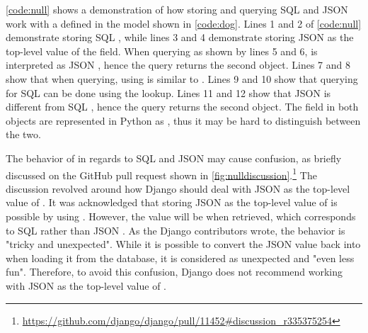 \noindent
\begin{minipage}{\linewidth}

\end{minipage}

\autoref{code:null} shows a demonstration of how storing and querying SQL
 and JSON  work with a  defined in the
 model shown in \autoref{code:dog}. Lines 1 and 2 of
\autoref{code:null} demonstrate storing SQL , while lines 3 and 4
demonstrate storing JSON  as the top-level value of the field. When
querying as shown by lines 5 and 6,  is interpreted as JSON
, hence the query returns the second object. Lines 7 and 8 show that
when querying, using  is similar to . Lines
9 and 10 show that querying for SQL  can be done using the
 lookup. Lines 11 and 12 show that JSON  is different
from SQL , hence the query returns the second object. The
 field in both objects are represented in Python as ,
thus it may be hard to distinguish between the two.

The behavior of  in regards to SQL  and JSON
 may cause confusion, as briefly discussed on the GitHub pull
request shown in
\autoref{fig:nulldiscussion}.\footnote{\url{
	https://github.com/django/django/pull/11452\#discussion\_r335375254}}
The discussion revolved around how Django should deal with JSON  as
the top-level value of . It was acknowledged that storing JSON
 as the top-level value of  is possible by using
. However, the value will be  when retrieved, which
corresponds to SQL  rather than JSON . As the Django
contributors wrote, the behavior is "tricky and unexpected". While it is
possible to convert the JSON  value back into 
when loading it from the database, it is considered as unexpected and "even
less fun". Therefore, to avoid this confusion, Django does not recommend
working with JSON  as the top-level value of .


